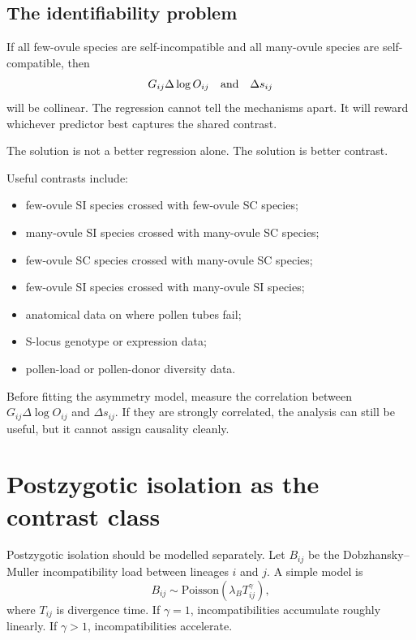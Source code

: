 \documentclass[12pt]{article}
\begin{document}
\subsection{The identifiability problem}

If all few-ovule species are self-incompatible and all many-ovule species are self-compatible, then
\begin{equation}
G_{ij}\Delta\log O_{ij}
\quad \hbox{and} \quad
\Delta s_{ij}
\end{equation}
will be collinear. The regression cannot tell the mechanisms apart. It will reward whichever predictor best captures the shared contrast.

The solution is not a better regression alone. The solution is better contrast.

Useful contrasts include:
\begin{itemize}
\item few-ovule SI species crossed with few-ovule SC species;
\item many-ovule SI species crossed with many-ovule SC species;
\item few-ovule SC species crossed with many-ovule SC species;
\item few-ovule SI species crossed with many-ovule SI species;
\item anatomical data on where pollen tubes fail;
\item S-locus genotype or expression data;
\item pollen-load or pollen-donor diversity data.
\end{itemize}

\begin{cautionbox}
Before fitting the asymmetry model, measure the correlation between $G_{ij}\Delta\log O_{ij}$ and $\Delta s_{ij}$. If they are strongly correlated, the analysis can still be useful, but it cannot assign causality cleanly.
\end{cautionbox}

\section{Postzygotic isolation as the contrast class}

Postzygotic isolation should be modelled separately. Let $B_{ij}$ be the Dobzhansky--Muller incompatibility load between lineages $i$ and $j$. A simple model is
\begin{equation}
B_{ij}\sim \mathrm{Poisson}(\lambda_BT_{ij}^{\gamma}),
\label{eq:BDM}
\end{equation}
where $T_{ij}$ is divergence time. If $\gamma=1$, incompatibilities accumulate roughly linearly. If $\gamma>1$, incompatibilities accelerate.
\end{document}
